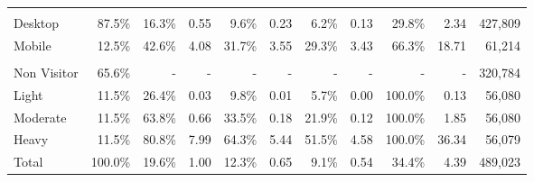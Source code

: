 \begin{tabular}{lrrrrrrrrrr}
\addlinespace
\multicolumn{11}{l}{\textbf{Device Type}} \\
\quad Desktop & 87.5\% & 16.3\% & 0.55 & 9.6\% & 0.23 & 6.2\% & 0.13 & 29.8\% & 2.34 & 427,809 \\
\quad Mobile & 12.5\% & 42.6\% & 4.08 & 31.7\% & 3.55 & 29.3\% & 3.43 & 66.3\% & 18.71 & 61,214 \\
\addlinespace
\multicolumn{11}{l}{\textbf{XXX Usage Tercile$^\dagger$}} \\
\quad Non Visitor & 65.6\% & - & - & - & - & - & - & - & - & 320,784 \\
\quad Light & 11.5\% & 26.4\% & 0.03 & 9.8\% & 0.01 & 5.7\% & 0.00 & 100.0\% & 0.13 & 56,080 \\
\quad Moderate & 11.5\% & 63.8\% & 0.66 & 33.5\% & 0.18 & 21.9\% & 0.12 & 100.0\% & 1.85 & 56,080 \\
\quad Heavy & 11.5\% & 80.8\% & 7.99 & 64.3\% & 5.44 & 51.5\% & 4.58 & 100.0\% & 36.34 & 56,079 \\
\midrule
Total & 100.0\% & 19.6\% & 1.00 & 12.3\% & 0.65 & 9.1\% & 0.54 & 34.4\% & 4.39 & 489,023 \\
\bottomrule
\end{tabular}
